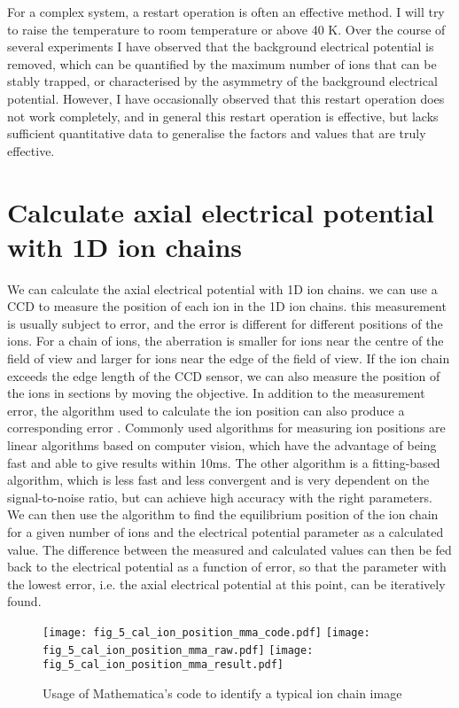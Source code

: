 For a complex system, a restart operation is often an effective method. I will try to raise the temperature to room temperature or above 40 K. Over the course of several experiments I have observed that the background electrical potential is removed, which can be quantified by the maximum number of ions that can be stably trapped, or characterised by the asymmetry of the background electrical potential. However, I have occasionally observed that this restart operation does not work completely, and in general this restart operation is effective, but lacks sufficient quantitative data to generalise the factors and values that are truly effective.



\section{Calculate axial electrical potential with 1D ion chains}

We can calculate the axial electrical potential with 1D ion chains. we can use a CCD to measure the position of each ion in the 1D ion chains. this measurement is usually subject to error, and the error is different for different positions of the ions. For a chain of ions, the aberration is smaller for ions near the centre of the field of view and larger for ions near the edge of the field of view. If the ion chain exceeds the edge length of the CCD sensor, we can also measure the position of the ions in sections by moving the objective. In addition to the measurement error, the algorithm used to calculate the ion position can also produce a corresponding error \cite{RN119,RN117,RN228,RN226,RN229,RN227}. Commonly used algorithms for measuring ion positions are linear algorithms based on computer vision, which have the advantage of being fast and able to give results within 10ms. The other algorithm is a fitting-based algorithm, which is less fast and less convergent and is very dependent on the signal-to-noise ratio, but can achieve high accuracy with the right parameters. We can then use the algorithm to find the equilibrium position of the ion chain for a given number of ions and the electrical potential parameter as a calculated value. The difference between the measured and calculated values can then be fed back to the electrical potential as a function of error, so that the parameter with the lowest error, i.e. the axial electrical potential at this point, can be iteratively found.

\begin{figure}
    \centering
    {\texttt{[image: fig\_5\_cal\_ion\_position\_mma\_code.pdf]}}
    {\texttt{[image: fig\_5\_cal\_ion\_position\_mma\_raw.pdf]}}
    {\texttt{[image: fig\_5\_cal\_ion\_position\_mma\_result.pdf]}}
    \caption{Usage of Mathematica's code to identify a typical ion chain image}
    \label{fig:cal_ion_position_mma}
\end{figure}


